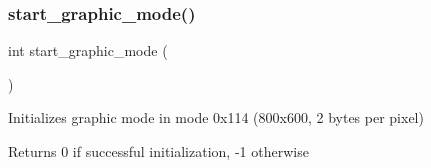 \subsubsection{\texorpdfstring{start\+\_\+graphic\+\_\+mode()}{start\_graphic\_mode()}}
{\footnotesize\ttfamily int start\+\_\+graphic\+\_\+mode (\begin{DoxyParamCaption}{ }\end{DoxyParamCaption})}



Initializes graphic mode in mode 0x114 (800x600, 2 bytes per pixel) 

\begin{DoxyReturn}{Returns}
0 if successful initialization, -\/1 otherwise 
\end{DoxyReturn}
